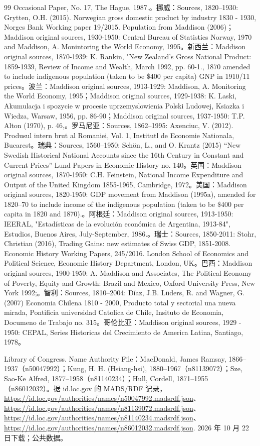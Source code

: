 \begin{thebibliography}{99}
Occasional Paper, No. 17, The Hague, 1987.。挪威：Sources, 1820–1930: Grytten, O.H. (2015). Norwegian gross domestic product by industry 1830 - 1930, Norges Bank Working paper 19/2015. Population from Maddison (2006)；Maddison original sources, 1930-1950: Central Bureau of Statistics Norway, 1970 and Maddison, A. Monintoring the World Economy, 1995。新西兰：Maddison original sources, 1870-1939: K. Rankin, "New Zealand's Gross National Product: 1859-1939, Review of Income and Wealth, March 1992, pp. 60-1., 1870 amended to include indigenous population (taken to be \$400 per capita) GNP in 1910/11 prices。波兰：Maddison original sources, 1913-1929: Maddison, A. Monitoring the World Economy, 1995；Maddison original sources, 1929-1938: K. Laski, Akumulacja i spozycie w procesie uprzemyslowienia Polski Ludowej, Ksiazka i Wiedza, Warsaw, 1956, pp. 86-90；Maddison original sources, 1937-1950: T.P. Alton (1970), p. 46,。罗马尼亚：Sources, 1862–1995: Axenciuc, V. (2012). Produsul intern brut al Romaniei, Vol. 1, Institutl de Economie Nationala, Bucarest。瑞典：Sources, 1560–1950: Schön, L., and O. Krantz (2015) “New Swedish Historical National Accounts since the 16th Century in Constant and Current Prices” Lund Papers in Economic History no. 140。英国：Maddison original sources, 1870-1950: C.H. Feinstein, National Income Expenditure and Output of the United Kingdom 1855-1965, Cambridge, 1972。美国：Maddison original sources, 1820-1950: GDP movement from Maddison (1995a), amended for 1820–70 to include income of the indigenous population (taken to be \$400 per capita in 1820 and 1870).。阿根廷：Maddison original sources, 1913-1950: IEERAL, "Estadísticas de la evolución económica de Argentina, 1913-84", Estudios, Buenos Aires, July-September, 1986.。瑞士：Sources, 1850-2011: Stohr, Christian (2016), Trading Gains: new estimates of Swiss GDP, 1851-2008. Economic History Working Papers, 245/2016. London School of Economics and Political Science, Economic History Department, London, UK。巴西：Maddison original sources, 1900-1950: A. Maddison and Associates, The Political Economy of Poverty, Equity and Growth: Brazil and Mexico, Oxford University Press, New York 1992;。智利：Sources, 1810–2004: Díaz, J.B. Lüders, R. and Wagner, G. (2007) Economia Chilena 1810 - 2000, Producto total y sectorial una nueva mirada, Pontificia universidad Catolica de Chile, Insituto de Economia, Documeno de Trabajo no. 315。哥伦比亚：Maddison original sources, 1929 - 1950: CEPAL, Series Historicas del Crecimiento de America Latina, Santiago, 1978。

 Library of Congress. Name Authority File：MacDonald, James Ramsay, 1866--1937（n50047992）；Kung, H. H. (Hsiang-hsi), 1880--1967（n81139072）；Sze, Sao-Ke Alfred, 1877--1958（n81140234）；Hull, Cordell, 1871--1955（n86012032）。据 id.loc.gov 的 MADS/RDF 记录，\url{https://id.loc.gov/authorities/names/n50047992.madsrdf.json}、\url{https://id.loc.gov/authorities/names/n81139072.madsrdf.json}、\url{https://id.loc.gov/authorities/names/n81140234.madsrdf.json}、\url{https://id.loc.gov/authorities/names/n86012032.madsrdf.json}. 2026 年 10 月 22 日下载；公共数据。


\end{thebibliography}
